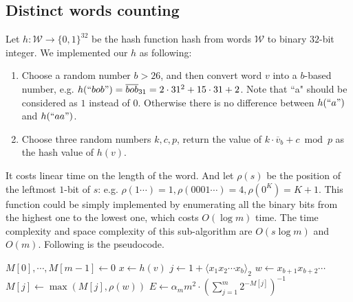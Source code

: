 \documentclass{article}
\begin{document}
        \subsection{Distinct words counting}
            Let $h: \mathcal{W} \rightarrow \{0, 1\}^{32}$ be the hash function hash from words $\mathcal{W}$ to binary $32$-bit integer.
			We implemented our $h$ as following:
				\begin{enumerate}
					\item Choose a random number $b > 26$, and then convert word $v$ into a $b$-based number, e.g. $h(``bob") =
						\overline{bob}_{31} = 
						2 \cdot 31^2 + 15 \cdot 31 + 2$. Note that ``a" should be considered as $1$ instead of $0$. Otherwise there is no
						difference between $h(``a")$ and $h(``aa")$.
					\item Choose three random numbers $k, c, p$, return the value of $k \cdot \overline{v}_b + c \bmod{p}$ as the hash value
						of $h(v)$.
				\end{enumerate}
			It costs linear time on the length of the word.
			\newline
			\newline
            And let $\rho(s)$ be the position of the leftmost $1$-bit of $s$: e.g. $\rho(1\cdots) = 1, \rho(0001\cdots) = 4, \rho(0^K) = K + 1$.
			This function could be simply implemented by enumerating all the binary bits from the highest one to the lowest one, which costs
			$O(\log m)$ time.
			The time complexity and space complexity of this sub-algorithm are $O(s \log m)$ and $O(m)$. Following is the pseudocode.

                \begin{center}
                \begin{algorithmic}
                                \State $M[0], \cdots, M[m - 1]\gets 0$
                                        \State $x \gets h(v)$
                                        \State $j \gets 1 + \langle x_1 x_2 \cdots x_b \rangle_2$
                                        \State $w \gets x_{b + 1}x_{b + 2}\cdots$
                                        \State $M[j] \gets \max(M[j], \rho(w))$
                                \EndFor
                                \State \Return $E \gets \alpha_m m^2 \cdot (\sum\limits^m_{j = 1} 2^{-M[j]})^{-1}$
                        \EndFunction
                \end{algorithmic}
                \end{center}
\end{document}
